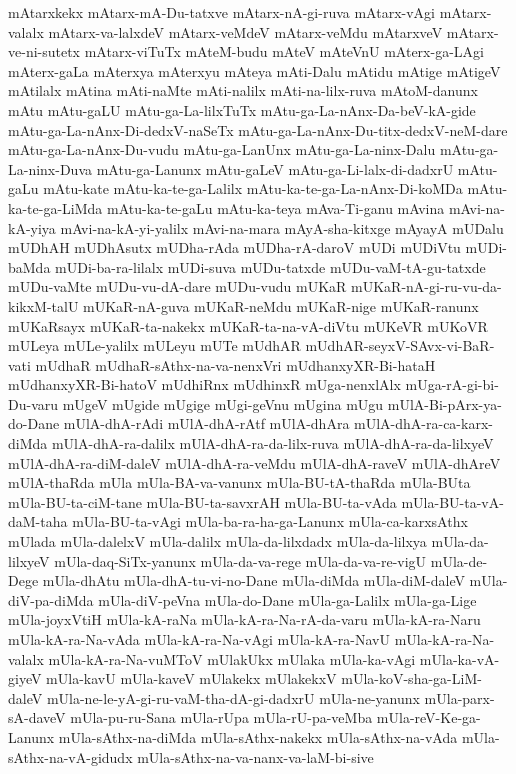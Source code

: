 {mAtarxkekx
mAtarx-mA-Du-tatxve
mAtarx-nA-gi-ruva
mAtarx-vAgi
mAtarx-valalx
mAtarx-va-lalxdeV
mAtarx-veMdeV
mAtarx-veMdu
mAtarxveV
mAtarx-ve-ni-sutetx
mAtarx-viTuTx
mAteM-budu
mAteV
mAteVnU
mAterx-ga-LAgi
mAterx-gaLa
mAterxya
mAterxyu
mAteya
mAti-Dalu
mAtidu
mAtige
mAtigeV
mAtilalx
mAtina
mAti-naMte
mAti-nalilx
mAti-na-lilx-ruva
mAtoM-danunx
mAtu
mAtu-gaLU
mAtu-ga-La-lilxTuTx
mAtu-ga-La-nAnx-Da-beV-kA-gide
mAtu-ga-La-nAnx-Di-dedxV-naSeTx
mAtu-ga-La-nAnx-Du-titx-dedxV-neM-dare
mAtu-ga-La-nAnx-Du-vudu
mAtu-ga-LanUnx
mAtu-ga-La-ninx-Dalu
mAtu-ga-La-ninx-Duva
mAtu-ga-Lanunx
mAtu-gaLeV
mAtu-ga-Li-lalx-di-dadxrU
mAtu-gaLu
mAtu-kate
mAtu-ka-te-ga-Lalilx
mAtu-ka-te-ga-La-nAnx-Di-koMDa
mAtu-ka-te-ga-LiMda
mAtu-ka-te-gaLu
mAtu-ka-teya
mAva-Ti-ganu
mAvina
mAvi-na-kA-yiya
mAvi-na-kA-yi-yalilx
mAvi-na-mara
mAyA-sha-kitxge
mAyayA
mUDalu
mUDhAH
mUDhAsutx
mUDha-rAda
mUDha-rA-daroV
mUDi
mUDiVtu
mUDi-baMda
mUDi-ba-ra-lilalx
mUDi-suva
mUDu-tatxde
mUDu-vaM-tA-gu-tatxde
mUDu-vaMte
mUDu-vu-dA-dare
mUDu-vudu
mUKaR
mUKaR-nA-gi-ru-vu-da-kikxM-talU
mUKaR-nA-guva
mUKaR-neMdu
mUKaR-nige
mUKaR-ranunx
mUKaRsayx
mUKaR-ta-nakekx
mUKaR-ta-na-vA-diVtu
mUKeVR
mUKoVR
mULeya
mULe-yalilx
mULeyu
mUTe
mUdhAR
mUdhAR-seyxV-SAvx-vi-BaR-vati
mUdhaR
mUdhaR-sAthx-na-va-nenxVri
mUdhanxyXR-Bi-hataH
mUdhanxyXR-Bi-hatoV
mUdhiRnx
mUdhinxR
mUga-nenxlAlx
mUga-rA-gi-bi-Du-varu
mUgeV
mUgide
mUgige
mUgi-geVnu
mUgina
mUgu
mUlA-Bi-pArx-ya-do-Dane
mUlA-dhA-rAdi
mUlA-dhA-rAtf
mUlA-dhAra
mUlA-dhA-ra-ca-karx-diMda
mUlA-dhA-ra-dalilx
mUlA-dhA-ra-da-lilx-ruva
mUlA-dhA-ra-da-lilxyeV
mUlA-dhA-ra-diM-daleV
mUlA-dhA-ra-veMdu
mUlA-dhA-raveV
mUlA-dhAreV
mUlA-thaRda
mUla
mUla-BA-va-vanunx
mUla-BU-tA-thaRda
mUla-BUta
mUla-BU-ta-ciM-tane
mUla-BU-ta-savxrAH
mUla-BU-ta-vAda
mUla-BU-ta-vA-daM-taha
mUla-BU-ta-vAgi
mUla-ba-ra-ha-ga-Lanunx
mUla-ca-karxsAthx
mUlada
mUla-dalelxV
mUla-dalilx
mUla-da-lilxdadx
mUla-da-lilxya
mUla-da-lilxyeV
mUla-daq-SiTx-yanunx
mUla-da-va-rege
mUla-da-va-re-vigU
mUla-de-Dege
mUla-dhAtu
mUla-dhA-tu-vi-no-Dane
mUla-diMda
mUla-diM-daleV
mUla-diV-pa-diMda
mUla-diV-peVna
mUla-do-Dane
mUla-ga-Lalilx
mUla-ga-Lige
mUla-joyxVtiH
mUla-kA-raNa
mUla-kA-ra-Na-rA-da-varu
mUla-kA-ra-Naru
mUla-kA-ra-Na-vAda
mUla-kA-ra-Na-vAgi
mUla-kA-ra-NavU
mUla-kA-ra-Na-valalx
mUla-kA-ra-Na-vuMToV
mUlakUkx
mUlaka
mUla-ka-vAgi
mUla-ka-vA-giyeV
mUla-kavU
mUla-kaveV
mUlakekx
mUlakekxV
mUla-koV-sha-ga-LiM-daleV
mUla-ne-le-yA-gi-ru-vaM-tha-dA-gi-dadxrU
mUla-ne-yanunx
mUla-parx-sA-daveV
mUla-pu-ru-Sana
mUla-rUpa
mUla-rU-pa-veMba
mUla-reV-Ke-ga-Lanunx
mUla-sAthx-na-diMda
mUla-sAthx-nakekx
mUla-sAthx-na-vAda
mUla-sAthx-na-vA-gidudx
mUla-sAthx-na-va-nanx-va-laM-bi-sive
}
